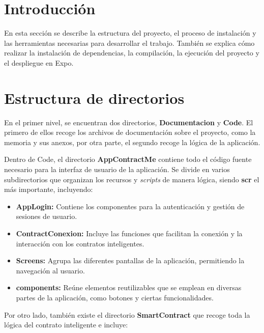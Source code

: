 
\section{Introducción}

En esta sección se describe la estructura del proyecto, el proceso de instalación y las herramientas necesarias para desarrollar el trabajo. También se explica cómo realizar la instalación de dependencias, la compilación, la ejecución del proyecto y el despliegue en Expo.

\section{Estructura de directorios}

En el primer nivel, se encuentran dos directorios, \textbf{Documentacion} y \textbf{Code}. El primero de ellos recoge los archivos de documentación sobre el proyecto, como la memoria y sus anexos, por otra parte, el segundo recoge la lógica de la aplicación.

Dentro de Code, el directorio \textbf{AppContractMe} contiene todo el código fuente necesario para la interfaz de usuario de la aplicación. Se divide en varios subdirectorios que organizan los recursos y \textit{scripts} de manera lógica, siendo \textbf{scr} el más importante, incluyendo:

\begin{itemize}

\item \textbf{AppLogin:} Contiene los componentes para la autenticación y gestión de sesiones de usuario.

\item \textbf{ContractConexion:} Incluye las funciones que facilitan la conexión y la interacción con los contratos inteligentes.

\item \textbf{Screens:} Agrupa las diferentes pantallas de la aplicación, permitiendo la navegación al usuario.

\item \textbf{components:} Reúne elementos reutilizables que se emplean en diversas partes de la aplicación, como botones y ciertas funcionalidades.

\end{itemize}

Por otro lado, también existe el directorio \textbf{SmartContract} que recoge toda la lógica del contrato inteligente e incluye:

